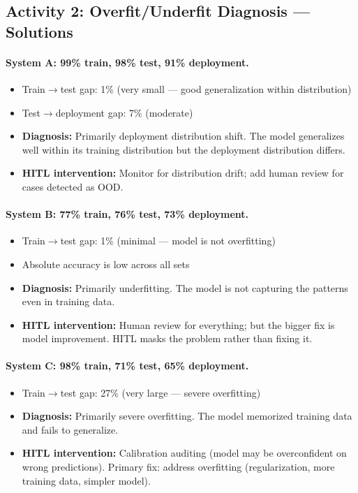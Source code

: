 \subsection{Activity 2: Overfit/Underfit Diagnosis --- Solutions}

\paragraph{System A: 99\% train, 98\% test, 91\% deployment.}
\begin{itemize}
    \item Train$\to$test gap: 1\% (very small --- good generalization within distribution)
    \item Test$\to$deployment gap: 7\% (moderate)
    \item \textbf{Diagnosis:} Primarily deployment distribution shift. The model generalizes well within its training distribution but the deployment distribution differs.
    \item \textbf{HITL intervention:} Monitor for distribution drift; add human review for cases detected as OOD.
\end{itemize}

\paragraph{System B: 77\% train, 76\% test, 73\% deployment.}
\begin{itemize}
    \item Train$\to$test gap: 1\% (minimal --- model is not overfitting)
    \item Absolute accuracy is low across all sets
    \item \textbf{Diagnosis:} Primarily underfitting. The model is not capturing the patterns even in training data.
    \item \textbf{HITL intervention:} Human review for everything; but the bigger fix is model improvement. HITL masks the problem rather than fixing it.
\end{itemize}

\paragraph{System C: 98\% train, 71\% test, 65\% deployment.}
\begin{itemize}
    \item Train$\to$test gap: 27\% (very large --- severe overfitting)
    \item \textbf{Diagnosis:} Primarily severe overfitting. The model memorized training data and fails to generalize.
    \item \textbf{HITL intervention:} Calibration auditing (model may be overconfident on wrong predictions). Primary fix: address overfitting (regularization, more training data, simpler model).
\end{itemize}

